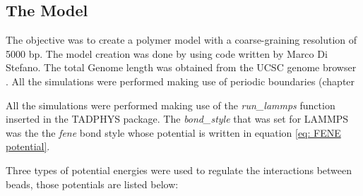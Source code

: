 
\subsection{The Model} \label{chap: the model description}
The objective was to create a polymer model with a coarse-graining resolution of 5000 bp.
The model creation was done by using code written by Marco Di Stefano.
The total Genome length was obtained from the UCSC genome browser
\cite{UCSCGenomeBrowser}
. All the simulations were performed making use of periodic boundaries (chapter %

All the simulations were performed making use of the \textit{run\_lammps} function inserted in the TADPHYS package. The \textit{bond\_style} that was set for LAMMPS
\cite{thompsonLAMMPSFlexibleSimulation2022}
was the the \textit{fene} bond style whose potential is written in equation \ref{eq: FENE potential}. 

Three types of potential energies were used to regulate the interactions between beads, those potentials are listed below:

